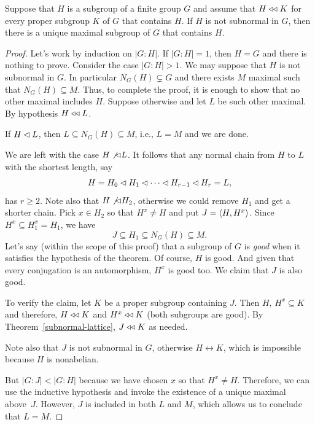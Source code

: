 \begin{thm}\label{zipper-lemma} {}
    Suppose that\/ $H$ is a subgroup of a finite group\/ $G$ and assume that\/ $H\mathrel{\triangleleft\triangleleft} K$ for every proper subgroup\/ $K$ of\/ $G$ that contains\/ $H$. If\/ $H$ is not subnormal in\/ $G$, then there is a unique maximal subgroup of\/ $G$ that contains\/ $H$.
\end{thm}

\begin{proof}
    Let's work by induction on $|G:H|$. If $|G:H|=1$, then $H=G$ and there is nothing to prove. Consider the case $|G:H|>1$. We may suppose that $H$ is not subnormal in $G$. In particular $N_G(H)\varsubsetneq G$ and there exists $M$ maximal such that $N_G(H)\subseteq M$. Thus, to complete the proof, it is enough to show that no other maximal includes $H$. Suppose otherwise and let $L$ be such other maximal. By hypothesis $H\mathrel{\triangleleft\triangleleft} L$.

    If $H\lhd L$, then $L\subseteq N_G(H)\subseteq M$, i.e., $L=M$ and we are done.
    
    We are left with the case $H\not\lhd L$. It follows that any normal chain from $H$ to $L$ with the shortest length, say
    $$
        H = H_0\lhd H_1\lhd\cdots\lhd H_{r-1}\lhd H_r = L,
    $$
    has $r\ge 2$. Note also that $H\not\lhd H_2$, otherwise we could remove $H_1$ and get a shorter chain. Pick $x\in H_2$ so that $H^x\ne H$ and put $J=\langle H,H^x\rangle$. Since $H^x\subseteq H_1^x = H_1$, we have
    $$
        J\subseteq H_1\subseteq N_G(H) \subseteq M.
    $$
    Let's say (within the scope of this proof) that a subgroup of $G$ is \textsl{good} when it satisfies the hypothesis of the theorem. Of course, $H$ is good. And given that every conjugation is an automorphism, $H^x$ is good too. We claim that $J$ is also good.
    
    To verify the claim, let $K$ be a proper subgroup containing $J$. Then $H,\,H^x\subseteq K$ and therefore, $H\mathrel{\triangleleft\triangleleft} K$ and $H^x\mathrel{\triangleleft\triangleleft} K$ (both subgroups are good). By Theorem~\ref{subnormal-lattice}, $J\mathrel{\triangleleft\triangleleft} K$ as needed.
    
    Note also that $J$ is not subnormal in $G$, otherwise $H\leftrightarrow K$, which is impossible because $H$ is nonabelian.
    
    But $|G:J|<|G:H|$ because we have chosen $x$ so that $H^x\ne H$. Therefore, we can use the inductive hypothesis and invoke the existence of a unique maximal above~$J$. However, $J$ is included in both $L$ and $M$, which allows us to conclude that $L=M$.
\end{proof}

